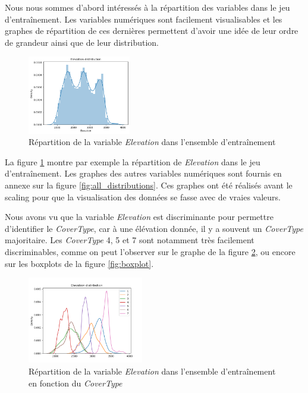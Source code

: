 \documentclass{article}
\begin{document}
Nous nous sommes d'abord intéressés à la répartition des variables dans le jeu d'entraînement. Les variables numériques sont facilement visualisables et les graphes de répartition de ces dernières permettent d'avoir une idée de leur ordre de grandeur ainsi que de leur distribution.

\begin{figure}[h]
  \centering
  \includegraphics[width=0.4\textwidth]{elevation_distribution.png}
    \caption{Répartition de la variable \textit{Elevation} dans l'ensemble d'entraînement}
  \label{fig:elevation}
\end{figure}

La figure \ref{fig:elevation} montre par exemple la répartition de \textit{Elevation} dans le jeu d'entraînement. Les graphes des autres variables numériques sont fournis en annexe sur la figure \ref{fig:all_distributions}. Ces graphes ont été réalisés avant le scaling pour que la visualisation des données se fasse avec de vraies valeurs.

Nous avons vu que la variable \textit{Elevation} est discriminante pour permettre d'identifier le \textit{CoverType}, car à une élévation donnée, il y a souvent un \textit{CoverType} majoritaire. Les \textit{CoverType} 4, 5 et 7 sont notamment très facilement discriminables, comme on peut l'observer sur le graphe de la figure \ref{fig:elevation_per_covertype}, ou encore sur les boxplots de la figure \ref{fig:boxplot}.

\begin{figure}[h]
  \centering
  \includegraphics[width=0.45\textwidth]{Elevation_distribution2.png}
    \caption{Répartition de la variable \textit{Elevation} dans l'ensemble d'entraînement en fonction du \textit{CoverType}}
  \label{fig:elevation_per_covertype}
\end{figure}
\end{document}
